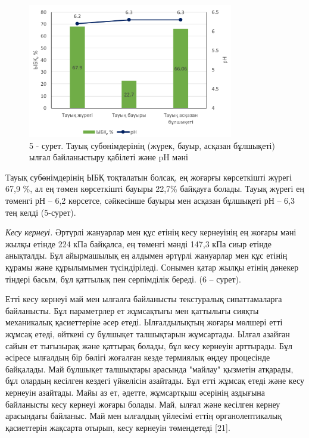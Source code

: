 \begin{figure}[H]
	\centering
	\includegraphics[width=0.8\textwidth]{media/pish/image8}
	\caption*{5 - сурет. Тауық субөнімдерінің (жүрек, бауыр, асқазан бұлшықеті) ылғал байланыстыру қабілеті және pH мәні}
\end{figure}

\begin{multicols}{2}
Тауық субөнімдерінің ЫБҚ тоқталатын болсақ, ең жоғарғы көрсеткішті
жүрегі 67,9 \%, ал ең төмен көрсеткішті бауыры 22,7\% байқауға болады.
Тауық жүрегі ең төменгі рН -- 6,2 көрсетсе, сәйкесінше бауыры мен
асқазан бұлшықеті рН -- 6,3 тең келді (5-сурет).

\emph{Кесу кернеуі.} Әртүрлі жануарлар мен құс етінің кесу кернеуінің ең
жоғары мәні жылқы етінде 224 кПа байқалса, ең төменгі мәнді 147,3 кПа
сиыр етінде анықталды. Бұл айырмашылық ең алдымен әртүрлі жануарлар мен
құс етінің құрамы және құрылымымен түсіндіріледі. Сонымен қатар жылқы
етінің дәнекер тіндері басым, бұл қаттылық пен серпімділік береді. (6 --
сурет).

Етті кесу кернеуі май мен ылғалға байланысты текстуралық сипаттамаларға
байланысты. Бұл параметрлер ет жұмсақтығы мен қаттылығы сияқты
механикалық қасиеттеріне әсер етеді. Ылғалдылықтың жоғары мөлшері етті
жұмсақ етеді, өйткені су бұлшықет талшықтарын жұмсартады. Ылғал азайған
сайын ет тығызырақ және қаттырақ болады, бұл кесу кернеуін арттырады.
Бұл әсіресе ылғалдың бір бөлігі жоғалған кезде термиялық өңдеу
процесінде байқалады. Май бұлшықет талшықтары арасында "майлау" қызметін
атқарады, бұл олардың кесілген кездегі үйкелісін азайтады. Бұл етті
жұмсақ етеді және кесу кернеуін азайтады. Майы аз ет, әдетте, жұмсартқыш
әсерінің аздығына байланысты кесу кернеуі жоғары болады. Май, ылғал және
кесілген кернеу арасындағы байланыс. Май мен ылғалдың үйлесімі еттің
органолептикалық қасиеттерін жақсарта отырып, кесу кернеуін төмендетеді
{[}21{]}.
\end{multicols}

